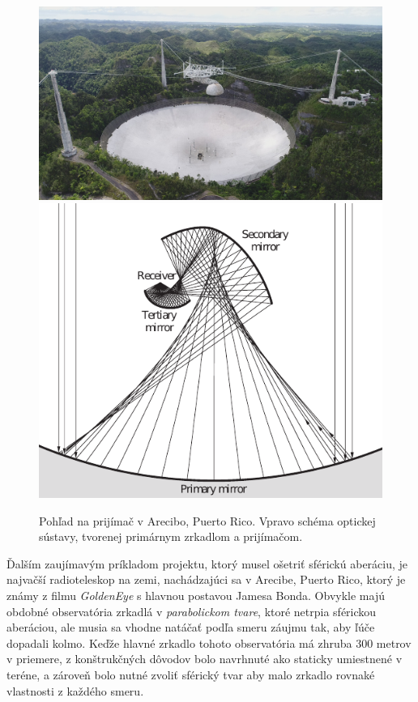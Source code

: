 \begin{figure}
    \includegraphics[scale=0.12]{obrazky-figures/areciboSite.jpg}
    \includegraphics[scale=0.65]{obrazky-figures/arecibo.pdf}
    \caption{Pohľad na prijímač v Arecibo, Puerto Rico. Vpravo schéma optickej sústavy, tvorenej
    primárnym zrkadlom a prijímačom.}
\end{figure}


Ďalším zaujímavým príkladom projektu, ktorý musel ošetriť sférickú aberáciu, je najvačší
radioteleskop na zemi, nachádzajúci sa v Arecibe, Puerto Rico, ktorý je známy z filmu
\textit{GoldenEye} s hlavnou postavou Jamesa Bonda. 
Obvykle majú obdobné observatória zrkadlá v \textit{parabolickom tvare}, ktoré netrpia sférickou
aberáciou, ale musia sa vhodne natáčať podľa smeru záujmu tak, aby ľúče dopadali kolmo. Keďže hlavné zrkadlo tohoto observatória má
zhruba 300 metrov v priemere, z konštrukčných dôvodov bolo navrhnuté ako staticky umiestnené v
teréne, a zároveň
bolo nutné zvoliť sférický tvar aby malo zrkadlo rovnaké vlastnosti z každého smeru.


